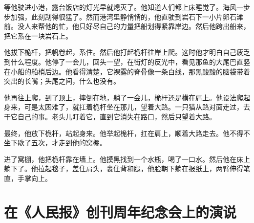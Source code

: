 \documentclass[12pt,UTF-8,openany]{ctexbook}
\begin{document}
\begin{normalsize}
    等他驶进小港，露台饭店的灯光早就熄灭了。他知道人们都上床睡觉了。海风一步步加强，此刻刮得很猛了。然而港湾里静悄悄的，他直驶到岩石下一小片卵石滩前。没人来帮他的忙，他只好尽自己的力量把船划得紧靠岸边。然后他跨出船来，把它系在一块岩石上。
    
    他拔下桅杆，把帆卷起，系住。然后他打起桅杆往岸上爬。这时他才明白自己疲乏到什么程度。他停了一会儿，回头一望，在街灯的反光中，看见那鱼的大尾巴直竖在小船的船梢后边。他看得清楚，它裸露的脊骨像一条白线，那黑黢黢的脑袋带着突出的长嘴；头尾之间，什么也没有。
    
    他再往上爬，到了顶上，摔倒在地，躺了一会儿，桅杆还是横在肩上。他设法爬起身来，可是太困难了，就扛着桅杆坐在那儿，望着大路。一只猫从路对面走过，去干它自己的事。老头儿盯着它，直到它消失在路口，然后只望着大路。
    
    最终，他放下桅杆，站起身来。他举起桅杆，扛在肩上，顺着大路走去。他不得不坐下歇了五次，才走到他的窝棚。
    
    进了窝棚，他把桅杆靠在墙上。他摸黑找到一个水瓶，喝了一口水。然后他在床上躺下了。他拉起毯子，盖住肩头，裹住背和腿，他脸朝下躺在报纸上，两臂伸得笔直，手掌向上。
    
\end{normalsize}



\chapter{在《人民报》创刊周年纪念会上的演说}
\end{document}

